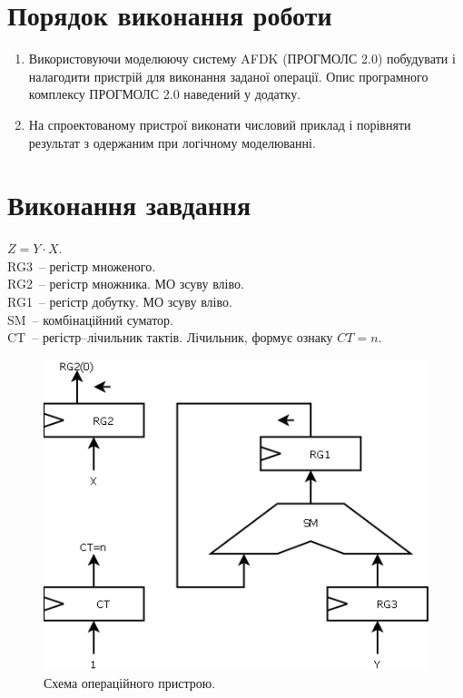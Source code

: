 \documentclass[a4paper, 10pt]{article}
\begin{document}
\section{Порядок виконання роботи}
\begin{enumerate}
    \item Використовуючи моделюючу систему AFDK (ПРОГМОЛС 2.0) побудувати і налагодити пристрій для виконання заданої операції. Опис програмного комплексу ПРОГМОЛС 2.0 наведений у додатку.
    \item На спроектованому пристрої виконати числовий приклад і порівняти результат з одержаним при логічному моделюванні.
\end{enumerate}

\section{Виконання завдання}
$Z=Y\cdot X.$\\
RG3~-- регістр множеного.\\
RG2~-- регістр множника. МО зсуву вліво.\\
RG1~-- регістр добутку. МО зсуву вліво.\\
SM~-- комбінаційний суматор.\\
CT~-- регістр--лічильник тактів. Лічильник, формує ознаку $CT=n$.\\

\begin{figure}[h!]
\begin{center}
\includegraphics[scale=0.5]{od.png}
\caption{Схема операційного пристрою.}
\end{center}
\end{figure}
\end{document}
